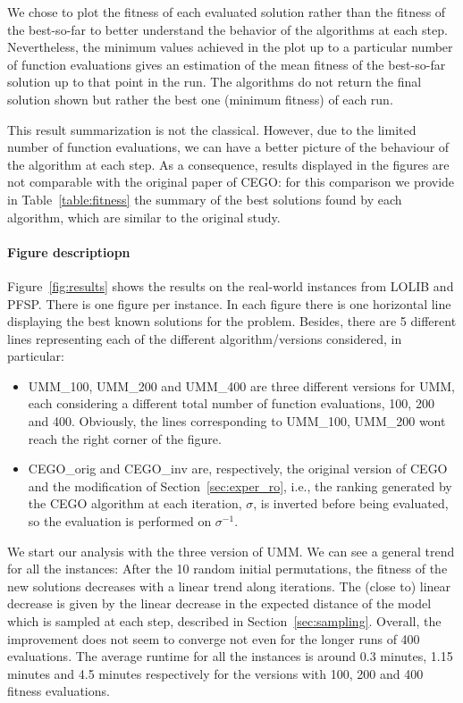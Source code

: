 \documentclass[sigconf,dvipsnames]{acmart}
\begin{document}
We chose to plot the fitness of each evaluated solution rather than the fitness
of the best-so-far to better understand the behavior of the algorithms at each
step. Nevertheless, the minimum values achieved in the plot up to a particular
number of function evaluations gives an estimation of the mean fitness of the
best-so-far solution up to that point in the run. The algorithms do not return
the final solution shown but rather the best one (minimum fitness) of each run.

This result summarization is not the classical. However, due to the limited number of function evaluations, we can have a better picture of the behaviour of the algorithm at each step. As a consequence, results displayed in the figures are not comparable with the original paper of CEGO: for this comparison we provide in Table~\ref{table:fitness} the summary of the best solutions found by each algorithm, which are similar to the original study. 

\paragraph{Figure descriptiopn} Figure~\ref{fig:results} shows the results on the real-world instances from LOLIB and PFSP. There is one figure per instance. In each figure there is one horizontal line displaying the best known solutions for the problem. Besides, there are 5 different lines representing each of the different algorithm/versions considered, in particular:
\begin{itemize}
\item UMM\_100, UMM\_200 and UMM\_400 are three different versions for UMM, each considering a different total number of function evaluations, 100, 200 and 400. Obviously, the lines corresponding to UMM\_100, UMM\_200 wont reach the right corner of the figure. 
\item CEGO\_orig and CEGO\_inv are, respectively, the original version of CEGO and the modification of Section~\ref{sec:exper_ro}, i.e., the ranking generated by the CEGO algorithm at each iteration, $\sigma$, is inverted before being evaluated, so the evaluation is performed on $\sigma^{-1}$. 
\end{itemize}


We start our analysis with the three version of UMM. We can see a general trend for all the instances: After the 10 random initial permutations, the fitness of the new solutions decreases with a linear trend along iterations. The (close to) linear decrease is given by the linear decrease in the expected distance of the model which is sampled at each step, described in Section~\ref{sec:sampling}. Overall, the improvement does not seem to converge not even for the longer runs of 400 evaluations.
The average runtime for all the instances is around 0.3 minutes, 1.15 minutes and 4.5 minutes respectively for the  versions with 100, 200 and 400 fitness evaluations. 
\end{document}
